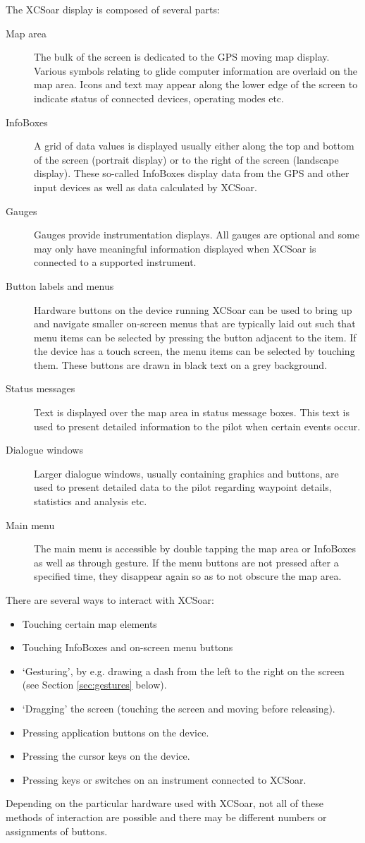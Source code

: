 The XCSoar display is composed of several parts:
\begin{description}
\item[Map area] The bulk of the screen is dedicated to the GPS moving map
display. Various symbols relating to glide computer information are overlaid 
on the map area. Icons and text may appear along the lower edge of the screen
to indicate status of connected devices, operating modes etc.
\item[InfoBoxes] A grid of data values is displayed usually either along
the top and bottom of the screen (portrait display) or to the right of the
screen (landscape display).  These so-called InfoBoxes display data from the
GPS and other input devices as well as data calculated by XCSoar.
\item[Gauges]  Gauges provide instrumentation displays. All gauges are optional
and some may only have meaningful information displayed when XCSoar is
connected to a supported instrument.
\item[Button labels and menus] Hardware buttons on the device running XCSoar
can be used to bring up and navigate smaller on-screen menus that are
typically laid out such that menu items can be selected by pressing the
button adjacent to the item.  If the device has a touch screen, the menu
items can be selected by touching them.  These buttons are drawn in black
text on a grey background.
\item[Status messages] Text is displayed over the map area in status message
boxes.  This text is used to present detailed information to the pilot when
certain events occur.
\item[Dialogue windows] Larger dialogue windows, usually containing graphics and
buttons, are used to present detailed data to the pilot regarding waypoint
details, statistics and analysis etc.
\item[Main menu] The main menu is accessible by double tapping the map area or
InfoBoxes as well as through gesture. If the menu buttons are
not pressed after a specified time, they disappear again so as to not obscure the map area.
\end{description}

There are several ways to interact with XCSoar:
\begin{itemize}
\item Touching certain map elements
\item Touching InfoBoxes and on-screen menu buttons
\item `Gesturing', by e.g. drawing a dash from the left to the right
  on the screen (see Section \ref{sec:gestures} below).
\item `Dragging' the screen (touching the screen and moving before releasing).
\item Pressing application buttons on the device.
\item Pressing the cursor keys on the device.
\item Pressing keys or switches on an instrument connected to XCSoar.
\end{itemize}
Depending on the particular hardware used with XCSoar, not all of these methods
of interaction are possible and there may be different numbers or assignments
of buttons.

